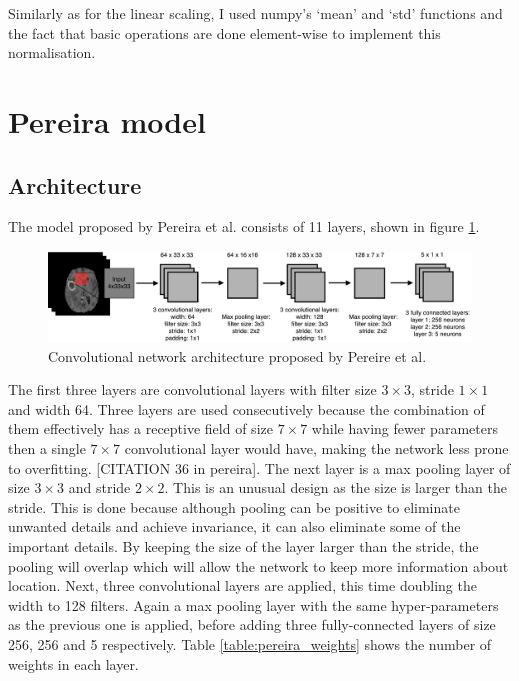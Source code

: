 \documentclass[12pt,a4paper,twoside,openright]{report}
\begin{document}
Similarly as for the linear scaling, I used numpy's `mean' and `std' functions and the fact that basic operations are done element-wise to implement this normalisation.

\section{Pereira model}

\subsection{Architecture}

The model proposed by Pereira et al. \cite{pereira} consists of 11 layers, shown in figure \ref{fig:pereira_model}. 
\begin{figure}
	\centering
	\includegraphics[width=\textwidth]{pereira_model}
	\caption{Convolutional network architecture proposed by Pereire et al.}
	\label{fig:pereira_model}
\end{figure}
The first three layers are convolutional layers with filter size $3 \times 3$, stride $1 \times 1$ and width 64. Three layers are used consecutively because the combination of them  effectively has a receptive field of size $7 \times 7$ while having fewer parameters then a single $7 \times 7$ convolutional layer would have, making the network less prone to overfitting. [CITATION 36 in pereira]. The next layer is a max pooling layer of size $3 \times 3$ and stride $2 \times 2$. This is an unusual design as the size is larger than the stride. This is done because although pooling can be positive to eliminate unwanted details and achieve invariance, it can also eliminate some of the important details. By keeping the size of the layer larger than the stride, the pooling will overlap which will allow the network to keep more information about location. Next, three convolutional layers are applied, this time doubling the width to 128 filters. Again a max pooling layer with the same hyper-parameters as the previous one is applied, before adding three fully-connected layers of size 256, 256 and 5 respectively. Table \ref{table:pereira_weights} shows the number of weights in each layer. 
\end{document}
